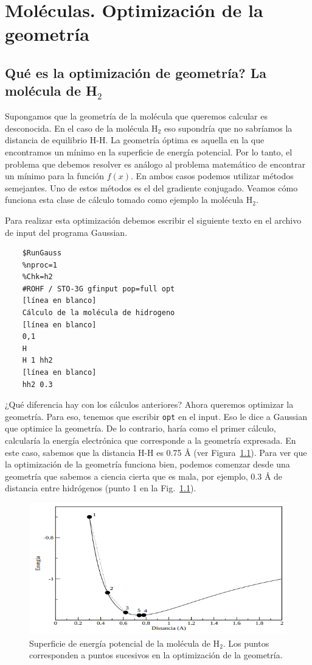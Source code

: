 \documentclass{tufte-book}
\begin{document}
\chapter{Moléculas. Optimización de la geometría}
\section{Qué es la optimización de geometría? La molécula de H$_2$}
Supongamos que la geometría de la molécula que queremos 
calcular es desconocida.  En el caso de la molécula H$_2$  eso
supondría que no sabríamos la distancia de equilibrio H-H. 
La geometría óptima es aquella en la que encontramos un mínimo 
en la superficie de energía potencial. Por lo tanto, el problema
que debemos resolver es análogo al problema matemático de 
encontrar un mínimo para la función $f(x)$. En ambos casos 
podemos utilizar métodos semejantes. Uno de estos métodos es el
del gradiente conjugado. Veamos cómo funciona esta clase de 
cálculo tomado como ejemplo la molécula H$_2$.

Para realizar esta optimización debemos escribir el siguiente
texto en el archivo de input del programa Gaussian. 
\begin{verbatim}
    $RunGauss
    %nproc=1
    %Chk=h2
    #ROHF / STO-3G gfinput pop=full opt
    [línea en blanco]
    Cálculo de la molécula de hidrogeno 
    [línea en blanco] 
    0,1
    H
    H 1 hh2
    [línea en blanco]
    hh2 0.3
\end{verbatim}

¿Qué diferencia hay con los cálculos anteriores? Ahora queremos
optimizar la geometría. Para eso, tenemos que escribir 
\texttt{opt} en el input. Eso le dice a Gaussian que optimice 
la geometría. De lo contrario, haría como el primer cálculo,
calcularía la energía electrónica que corresponde a la geometría
expresada. En este caso, sabemos que la distancia H-H es 0.75 
{\AA} (ver Figura~\ref{fig:h2sing}). Para ver que la optimización
de la geometría funciona bien, podemos comenzar desde una
geometría que sabemos a ciencia cierta que es mala, por ejemplo,
0.3 {\AA} de distancia entre hidrógenos (punto 1 en la  
Fig.~\ref{fig:h2sing}). 

\begin{figure}[t!]
\centering
\includegraphics[scale=0.7]{PES_opt_H2.png}
\caption{Superficie de energía potencial de la molécula de H$_2$.
Los puntos corresponden a puntos sucesivos en la optimización
de la geometría.}
\label{fig:h2sing}
\end{figure}
\end{document}
